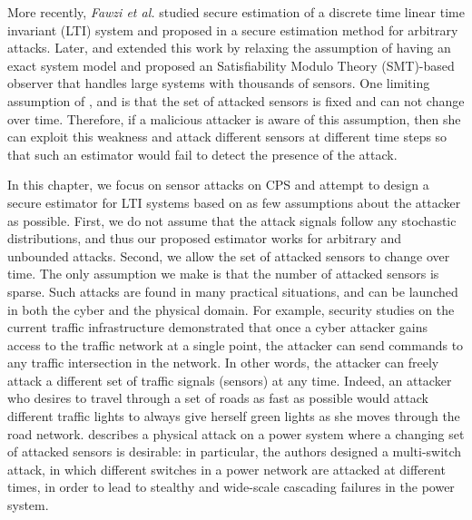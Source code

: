 \documentclass[../../thesis.tex]{subfiles}
\begin{document}
More recently,  \textit{Fawzi et al.} studied secure estimation of a discrete time linear time invariant (LTI) system and proposed in \cite{Fawzi:2014} a secure estimation method for arbitrary attacks. 
Later, \cite{Pajic:2014} and \cite{shoukry2016smt} extended this work by relaxing the assumption of having an exact system model and proposed an Satisfiability Modulo Theory (SMT)-based observer that handles large systems with thousands of sensors. 
One limiting assumption of \cite{Fawzi:2014}, \cite{Pajic:2014} and \cite{shoukry2016smt} is that the set of attacked sensors is fixed and can not change over time. 
Therefore, if a malicious attacker is aware of this assumption, then she can exploit this weakness and attack different sensors at different time steps so that such an estimator would fail to detect the presence of the attack.

In this chapter, we focus on sensor attacks on CPS and attempt to design a secure estimator for LTI systems based on as few assumptions about the attacker as possible. 
First, we do not assume that the attack signals follow any stochastic distributions, and thus our proposed estimator works for arbitrary and unbounded attacks.
Second, we allow the set of attacked sensors to change over time.
The only assumption we make is that the number of attacked sensors is sparse.
Such attacks are found in many practical situations, and can be launched in both the cyber and the physical domain.
For example, security studies on the current traffic infrastructure \cite{ghena2014traffic} demonstrated that once a cyber attacker gains access to the traffic network at a single point, the attacker can send commands to any traffic intersection in the network. 
In other words, the attacker can freely attack a different set of traffic signals (sensors) at any time. Indeed, an attacker who desires to travel through a set of roads as fast as possible would attack different traffic lights to always give herself green lights as she moves through the road network. 
\cite{liu2014coordinated} describes a physical attack on a power system where a changing set of attacked sensors is desirable: in particular, the authors designed a multi-switch attack, in which different switches in a power network are attacked at different times, in order to lead to stealthy and wide-scale cascading failures in the power system.
\end{document}
